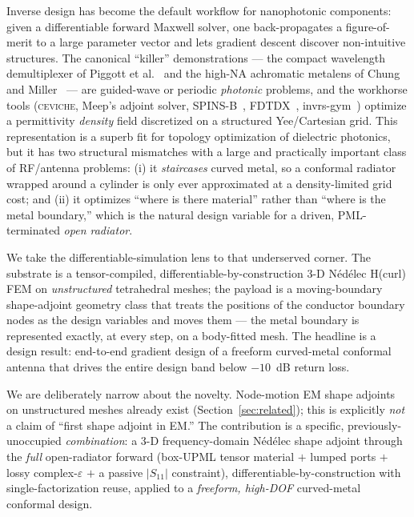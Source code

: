 \documentclass{anvil-paper}
\begin{document}
Inverse design has become the default workflow for nanophotonic components:
given a differentiable forward Maxwell solver, one back-propagates a
figure-of-merit to a large parameter vector and lets gradient descent discover
non-intuitive structures. The canonical ``killer'' demonstrations --- the
compact wavelength demultiplexer of Piggott et al.~\cite{piggott2015} and the
high-NA achromatic metalens of Chung and Miller~\cite{chung2020} --- are
guided-wave or periodic \emph{photonic} problems, and the workhorse tools
(\textsc{ceviche}, Meep's adjoint solver, SPINS-B~\cite{su_spinsb},
FDTDX~\cite{fdtdx}, invrs-gym~\cite{invrsgym}) optimize a permittivity
\emph{density} field discretized on a structured Yee/Cartesian grid. This
representation is a superb fit for topology optimization of dielectric
photonics, but it has two structural mismatches with a large and practically
important class of RF/antenna problems: (i) it \emph{staircases} curved metal,
so a conformal radiator wrapped around a cylinder is only ever approximated at a
density-limited grid cost; and (ii) it optimizes ``where is there material''
rather than ``where is the metal boundary,'' which is the natural design
variable for a driven, PML-terminated \emph{open radiator}.

We take the differentiable-simulation lens to that underserved corner. The
substrate is a tensor-compiled, differentiable-by-construction 3-D N\'ed\'elec
H(curl) FEM on \emph{unstructured} tetrahedral meshes; the payload is a
moving-boundary shape-adjoint geometry class that treats the positions of the
conductor boundary nodes as the design variables and moves them --- the metal
boundary is represented exactly, at every step, on a body-fitted mesh. The
headline is a design result: end-to-end gradient design of a freeform
curved-metal conformal antenna that drives the entire design band below
$-10$~dB return loss.

We are deliberately narrow about the novelty. Node-motion EM shape adjoints on
unstructured meshes already exist (Section~\ref{sec:related}); this is
explicitly \emph{not} a claim of ``first shape adjoint in EM.'' The contribution
is a specific, previously-unoccupied \emph{combination}: a 3-D frequency-domain
N\'ed\'elec shape adjoint through the \emph{full} open-radiator forward
(box-UPML tensor material $+$ lumped ports $+$ lossy complex-$\varepsilon$ $+$ a
passive $|S_{11}|$ constraint), differentiable-by-construction with
single-factorization reuse, applied to a \emph{freeform, high-DOF} curved-metal
conformal design.
\end{document}

